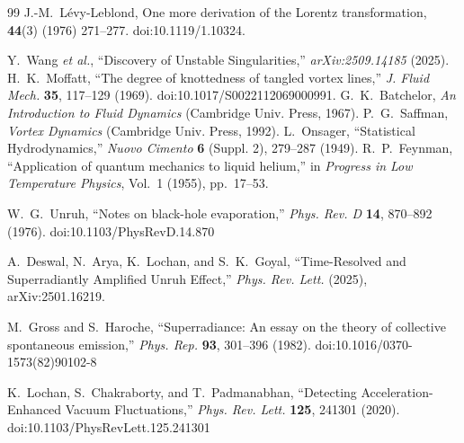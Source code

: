 \documentclass[10pt,reprint,aps,onecolumn,nofootinbib]{revtex4-2}
\begin{document}
\begin{thebibliography}{99}
                J.-M.~L{\'e}vy-Leblond,
                \newblock One more derivation of the Lorentz transformation,
                 \textbf{44}(3) (1976) 271--277.
                \newblock doi:10.1119/1.10324.


                Y.~Wang \emph{et al.}, ``Discovery of Unstable Singularities,''
                \emph{arXiv:2509.14185} (2025).
                H.~K.~Moffatt, ``The degree of knottedness of tangled vortex lines,'' \emph{J. Fluid Mech.} \textbf{35}, 117--129 (1969). doi:10.1017/S0022112069000991.
                G.~K.~Batchelor, \emph{An Introduction to Fluid Dynamics} (Cambridge Univ. Press, 1967).
                P.~G.~Saffman, \emph{Vortex Dynamics} (Cambridge Univ. Press, 1992).
                L.~Onsager, ``Statistical Hydrodynamics,'' \emph{Nuovo Cimento} \textbf{6} (Suppl. 2), 279--287 (1949).
                R.~P.~Feynman, ``Application of quantum mechanics to liquid helium,'' in \emph{Progress in Low Temperature Physics}, Vol.~1 (1955), pp.~17--53.

                W.~G.~Unruh,
                ``Notes on black-hole evaporation,''
                \textit{Phys. Rev. D} \textbf{14}, 870--892 (1976).
                doi:10.1103/PhysRevD.14.870

                A.~Deswal, N.~Arya, K.~Lochan, and S.~K.~Goyal,
                ``Time-Resolved and Superradiantly Amplified Unruh Effect,''
                \textit{Phys. Rev. Lett.} (2025), arXiv:2501.16219.

                M.~Gross and S.~Haroche,
                ``Superradiance: An essay on the theory of collective spontaneous emission,''
                \textit{Phys. Rep.} \textbf{93}, 301--396 (1982).
                doi:10.1016/0370-1573(82)90102-8

                K.~Lochan, S.~Chakraborty, and T.~Padmanabhan,
                ``Detecting Acceleration-Enhanced Vacuum Fluctuations,''
                \textit{Phys. Rev. Lett.} \textbf{125}, 241301 (2020).
                doi:10.1103/PhysRevLett.125.241301


\end{thebibliography}
\end{document}
